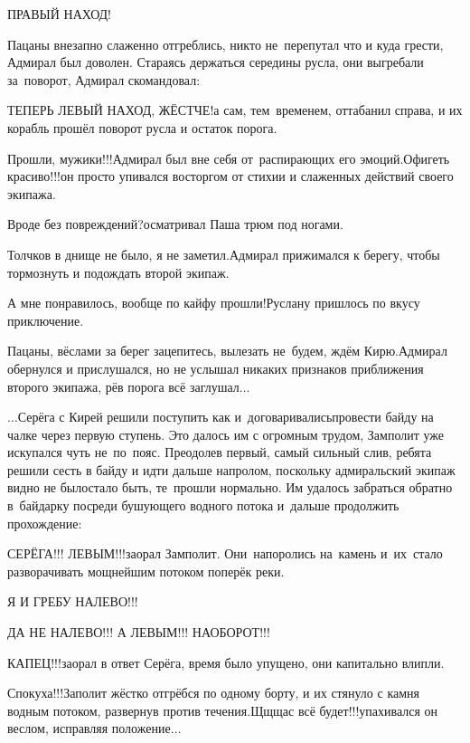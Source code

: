 \diagdash ПРАВЫЙ НАХОД!

Пацаны внезапно слаженно отгреблись, никто не~перепутал что и куда грести, Адмирал был доволен. Стараясь держаться середины русла, они выгребали за~поворот, Адмирал скомандовал:

\diagdash ТЕПЕРЬ ЛЕВЫЙ НАХОД, ЖЁСТЧЕ!\mdash а сам, тем~временем, оттабанил справа, и их корабль прошёл поворот русла и остаток порога.

\diagdash Прошли, мужики!!!\mdash Адмирал был вне себя от~распирающих его эмоций.\mdash Офигеть красиво!!!\mdash он просто упивался восторгом от стихии и слаженных действий своего экипажа.

\diagdash Вроде без повреждений?\mdash осматривал Паша трюм под ногами.

\diagdash Толчков в днище не было, я не заметил.\mdash Адмирал прижимался к берегу, чтобы тормознуть и подождать второй экипаж.

\diagdash А мне понравилось, вообще по кайфу прошли!\mdash Руслану пришлось по вкусу приключение.

\diagdash Пацаны, вёслами за берег зацепитесь, вылезать не~будем, ждём Кирю.\mdash Адмирал обернулся и прислушался, но не услышал никаких признаков приближения второго экипажа, рёв порога всё заглушал$\ldots$

$\ldots$Серёга с Кирей решили поступить как и~договаривались\mdash провести байду на чалке через первую ступень. Это далось им с огромным трудом, Замполит уже искупался чуть не~по~пояс. Преодолев первый, самый сильный слив, ребята решили сесть в байду и идти дальше напролом, поскольку адмиральский экипаж видно не было\mdash стало быть, те~прошли нормально. Им удалось забраться обратно в~байдарку посреди бушующего водного потока и~дальше продолжить прохождение:

\diagdash СЕРЁГА!!! ЛЕВЫМ!!!\mdash заорал Замполит. Они~напоролись на~камень и~их~стало разворачивать мощнейшим потоком поперёк реки.

\diagdash Я И ГРЕБУ НАЛЕВО!!!

\diagdash ДА НЕ НАЛЕВО!!! А ЛЕВЫМ!!! НАОБОРОТ!!!

\diagdash КАПЕЦ!!!\mdash заорал в ответ Серёга, время было упущено, они капитально влипли.

\diagdash Спокуха!!!\mdash Заполит жёстко отгрёбся по одному борту, и их стянуло с камня водным потоком, развернув против течения.\mdash Щ\sdash щ\sdash щас всё будет!!!\mdash упахивался он веслом, исправляя положение$\ldots$

